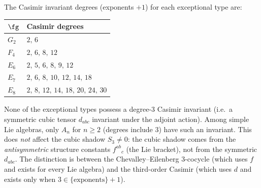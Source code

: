 \begin{remark}%
\label{rem:exceptional-no-cubic-casimir}
The Casimir invariant degrees (exponents $+ 1$) for each
exceptional type are:
\begin{center}
\renewcommand{\arraystretch}{1.2}
\begin{tabular}{ll}
\toprule
$\fg$ & Casimir degrees \\
\midrule
$G_2$ & $2,\, 6$ \\
$F_4$ & $2,\, 6,\, 8,\, 12$ \\
$E_6$ & $2,\, 5,\, 6,\, 8,\, 9,\, 12$ \\
$E_7$ & $2,\, 6,\, 8,\, 10,\, 12,\, 14,\, 18$ \\
$E_8$ & $2,\, 8,\, 12,\, 14,\, 18,\, 20,\, 24,\, 30$ \\
\bottomrule
\end{tabular}
\end{center}
None of the exceptional types possess a degree-$3$ Casimir
invariant (i.e.\ a symmetric cubic tensor $d_{abc}$ invariant
under the adjoint action). Among simple Lie algebras, only
$A_n$ for $n \ge 2$ (degrees include $3$) have such an invariant.
This does \emph{not} affect the cubic shadow $S_3 \neq 0$: the
cubic shadow comes from the \emph{antisymmetric} structure
constants $f^{ab}{}_c$ (the Lie bracket), not from the symmetric
$d_{abc}$. The distinction is between the Chevalley--Eilenberg
$3$-cocycle (which uses $f$ and exists for every Lie algebra) and
the third-order Casimir (which uses $d$ and exists only when
$3 \in \{\text{exponents}\} + 1$).
\end{remark}

